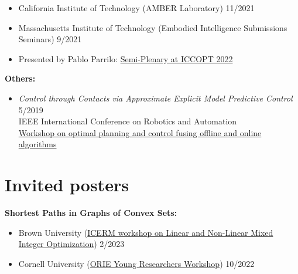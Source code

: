 \documentclass[11pt,a4paper,sans]{moderncv}
\begin{document}
\begin{itemize}
\item California Institute of Technology (AMBER Laboratory) \hfill 11/2021

\item Massachusetts Institute of Technology (Embodied Intelligence Submissions Seminars) \hfill 9/2021

\item
Presented by Pablo Parrilo:
\href{https://iccopt2022.lehigh.edu/scientific-program/semi-plenary-speakers/}{\color{cyan}Semi-Plenary at ICCOPT 2022}

\end{itemize}

\vspace{5pt}

\textbf{Others:}

\vspace{5pt}

\begin{itemize}

\item \textit{Control through Contacts via Approximate Explicit Model Predictive Control} \hfill 5/2019 \\
IEEE International Conference on Robotics and Automation \\
\href{https://sites.google.com/mit.edu/icra19ws/speakers?authuser=0}{\color{cyan}Workshop  on optimal planning and control fusing offline and online algorithms}

\end{itemize}

\section{Invited posters}

\vspace{5pt}

\textbf{Shortest Paths in Graphs of Convex Sets:}

\vspace{5pt}

\begin{itemize}

\item
Brown University
(\href{https://icerm.brown.edu/programs/sp-s23/w1/}{\color{cyan}ICERM workshop on Linear and Non-Linear Mixed Integer Optimization})
\hfill 2/2023

\item
Cornell University
(\href{https://www.orie.cornell.edu/orie-events/young-researchers-workshop}{\color{cyan}ORIE Young Researchers Workshop})
\hfill 10/2022

\end{itemize}
\end{document}
